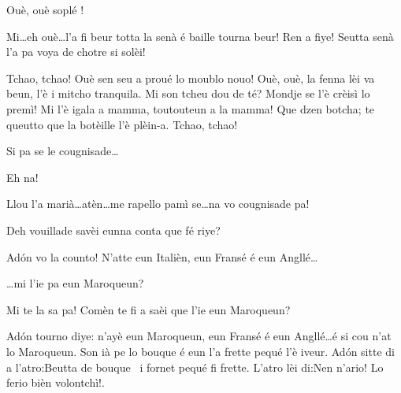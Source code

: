 \begin{drama}

\Valletspeaks{} Ouè, ouè soplé !


\Prosperospeaks Mi\ldots eh ouè\ldots l'a fi beur totta la senà é baille tourna beur! Ren a fiye! Seutta senà l'a pa voya de chotre si solèi!

\Prosperospeaks{} Tchao, tchao! Ouè sen seu a proué lo moublo nouo! Ouè, ouè, la fenna lèi va beun, l'è i mitcho tranquila. Mi son tcheu dou de té? Mondje se l'è crèisì lo premì! Mi l'è igala a mamma, toutouteun a la mamma! Que dzen botcha; te queutto que la botèille l'è plèin-a. Tchao, tchao!


\Prosperospeaks{} Si pa se le cougnisade\ldots

\Valletspeaks Eh na!

\Prosperospeaks Llou l'a marià\ldots atèn\ldots me rapello pamì se\ldots na  vo cougnisade pa!


\Prosperospeaks{} Deh vouillade savèi eunna conta que fé riye?


\Prosperospeaks Ad\'on vo la counto! N’atte eun Italièn, eun Fransé é eun Angllé\ldots 

\Vetchotspeaks \ldots mi l'ie pa eun Maroqueun?

\Prosperospeaks Mi te la sa pa! Comèn te fi a saèi que l'ie eun Maroqueun?


\Prosperospeaks{} Ad\'on tourno diye: n'ayè eun Maroqueun, eun Fransé é eun Angllé\ldots é si cou n'at lo Maroqueun. Son ià pe lo bouque é eun l'a frette pequé l'è iveur. Ad\'on sitte di a l'atro:\og Beutta de bouque \legna\ i fornet pequé fi frette\fg . L'atro lèi di:\og Nen n'ario! Lo ferio bièn volontchì!\fg .


\end{drama}
